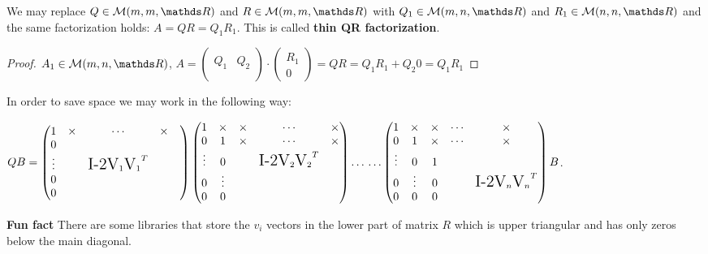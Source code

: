 \documentclass[ComputationalMathematics.tex]{subfiles}
\begin{document}
\begin{proposition} 
  We may replace $Q \in \mathcal{M}(m, m, \R)$ and $R \in \mathcal{M}(m, m, \R)$ with $Q_1 \in \mathcal{M}(m, n, \R)$ and $R_1 \in \mathcal{M}(n, n, \R)$ and the same factorization holds: $A=QR=Q_1R_1$. This is called \textbf{thin QR factorization}.
\end{proposition}
\begin{proof}
 $A_{1} \in \mathcal{M}(m, n, \R)$, $ A =\begin{pmatrix}
    &\\
    Q_{1} & Q_{2}\\
    &\\
  \end{pmatrix}
  \cdot
  \begin{pmatrix}
    R_{1}\\
    0
  \end{pmatrix}
  =
  Q R
  =
    Q_{1} R_{1}
  +
    Q_{2} 0
  =
  Q_{1} R_{1}$
\end{proof}
In order to save space we may work in the following way:

$Q B =
  \begin{pmatrix}
    1 & \times &\cdots & \times\\
    0 &&&&\\
    \vdots &&\text{\Large I-2V}_1 {\text{\Large V}_1}^{T}&\\
    0 &&&&\\
    0 &&&&
  \end{pmatrix} 
  \begin{pmatrix}
    1 & \times & \times & \cdots & \times\\
    0 & 1 &\times & \cdots& \times\\
    \vdots & 0 &&\text{\Large I-2V}_2 {\text{\Large V}_2}^{T}\\
    0 & \vdots &&&\\
    0 & 0 &&
  \end{pmatrix} \ldots \\ \ldots
  \begin{pmatrix}
    1 & \times & \times & \cdots & \times\\
    0 & 1 & \times & \cdots & \times\\
    \vdots & 0 & 1 &\\
    0 & \vdots & 0 &&\text{\Large I-2V}_n {\text{\Large V}_n}^{T}\\
    0 & 0 & 0 &
  \end{pmatrix} B$.

\begin{myframe}{\bf Fun fact}
There are some libraries that store the $v_{i}$ vectors in the lower part of matrix $R$ which is upper triangular and has only zeros below the main diagonal.
\end{myframe}
\end{document}
